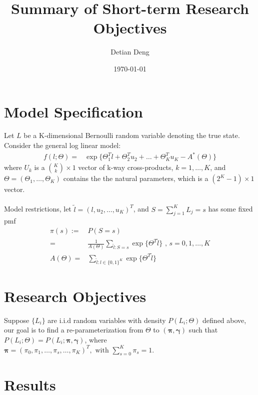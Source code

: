 \documentclass[11 pt, a4paper]{article}  %
\begin{document}
\title{Summary of Short-term Research Objectives}   %
\author{Detian Deng}         %
\date{\today}    %
\maketitle


\section{Model Specification}             %
Let $L$ be a K-dimensional Bernoulli random variable denoting the true state.
Consider the general log linear model:
\begin{align*}
f(l; \Theta) = & \exp \{\Theta_1^T l + \Theta_2^{T} u_2 + \ldots + \Theta_K^T u_K - A^*(\Theta)\}
\end{align*}
where $U_k$ is a ${K \choose k} \times 1$ vector of k-way cross-products, $k = 1,\ldots,K$,  and $\Theta = (\Theta_1,\ldots, \Theta_K)$ contains the the natural parameters, which is a $(2^K-1) \times 1$ vector.\\
\ \\
Model restrictions, let $\tilde{l} = (l,u_2,\dots,u_K)^T$, and $S = \sum_{j=1}^K L_j = s$ has some fixed pmf 
\begin{align}
\pi(s) := & P(S=s)\nonumber \\ 
= & \frac{1}{A(\Theta)} \sum_{\tilde{l}:S=s}\exp \{ \Theta^T \tilde{l}\}  \text{ , } s = 0,1,\ldots, K \\
A(\Theta) = & \sum_{\tilde{l}:l\in \{0,1\}^K}\exp \{ \Theta^T \tilde{l}\}
\end{align}

\newpage

\section{Research Objectives}
Suppose $\{L_i\}$ are i.i.d random variables with density $P(L_i;\Theta)$ defined above, our goal is to find a re-parameterization
from $\Theta$ to $(\boldsymbol\pi, \boldsymbol\gamma)$ such that $P(L_i;\Theta) = P(L_i;\boldsymbol\pi, \boldsymbol\gamma)$, where 
$\boldsymbol\pi = (\pi_0,\pi_1,\ldots,\pi_s,\ldots,\pi_K)^T, \text{ with }\sum_{s=0}^K \pi_s = 1$.

\section{Results}
\end{document}
